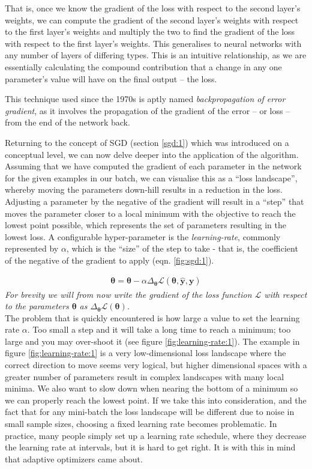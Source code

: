 \documentclass{report}
\begin{document}
That is, once we know the gradient of the loss with respect to the second layer's weights, we can compute the gradient of the second layer's weights with respect to the first layer's weights and multiply the two to find the gradient of the loss with respect to the first layer's weights. This generalises to neural networks with any number of layers of differing types. This is an intuitive relationship, as we are essentially calculating the compound contribution that a change in any one parameter's value will have on the final output -- the loss.  \par
This technique used since the 1970s is aptly named \textit{backpropagation of error gradient}\parencite{backprop}, as it involves the propagation of the gradient of the error -- or loss -- from the end of the network back. \par
Returning to the concept of SGD (section \ref{sgd:1}) which was introduced on a conceptual level, we can now delve deeper into the application of the algorithm. Assuming that we have computed the gradient of each parameter in the network for the given examples in our batch, we can visualise this as a ``loss landscape'', whereby moving the parameters down-hill results in a reduction in the loss. Adjusting a parameter by the negative of the gradient will result in a ``step'' that moves the parameter closer to a local minimum with the objective to reach the lowest point possible, which represents the set of parameters resulting in the lowest loss. A configurable hyper-parameter is the \textit{learning-rate}, commonly represented by $\alpha$, which is the ``size'' of the step to take - that is, the coefficient of the negative of the gradient to apply (eqn. \ref{fig:sgd:1}). \par
\begin{align} \label{fig:sgd:1}
 \bm{\theta} = \bm{\theta} - \alpha \Delta_{\bm{\theta}} \mathcal{L}(\bm{\theta}, \bm{\hat{y}}, \bm{y})
\end{align}
\textit{For brevity we will from now write the gradient of the loss function $\mathcal{L}$ with respect to the parameters $\bm{\theta}$ as $\Delta_{\bm{\theta}} \mathcal{L}(\bm{\theta})$.} \\
The problem that is quickly encountered is how large a value to set the learning rate $\alpha$. Too small a step and it will take a long time to reach a minimum; too large and you may over-shoot it (see figure \ref{fig:learning-rate:1}). The example in figure \ref{fig:learning-rate:1} is a very low-dimensional loss landscape where the correct direction to move seems very logical, but higher dimensional spaces with a greater number of parameters result in complex landscapes with many local minima. We also want to slow down when nearing the bottom of a minimum so we can properly reach the lowest point. If we take this into consideration, and the fact that for any mini-batch the loss landscape will be different due to noise in small sample sizes, choosing a fixed learning rate becomes problematic. In practice, many people simply set up a learning rate schedule, where they decrease the learning rate at intervals, but it is hard to get right. It is with this in mind that adaptive optimizers came about. \par
\end{document}

